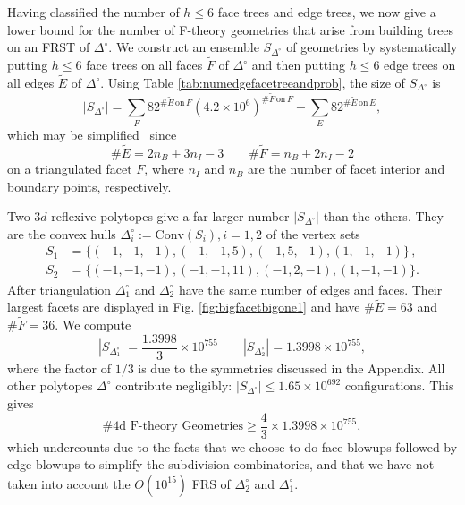 \documentclass[aps,prl,twocolumn, superscriptaddress,groupedaddress,nofootinbib]{revtex4-1}
\newcommand{\sdoc}{S_{\Delta_1^\circ}}
\newcommand{\sdtc}{S_{\Delta_2^\circ}}
\newcommand{\doc}{{\Delta_1^\circ}}
\newcommand{\dtc}{{\Delta_2^\circ}}
\begin{document}
\vspace{.5cm}
Having classified the number of $h\leq 6$ face trees and edge trees, we now give a lower bound for
the number of F-theory geometries that arise from building trees on an FRST of 
$\Delta^\circ$. 
We construct an ensemble $S_{\Delta^\circ}$ of geometries by systematically putting $h\leq 6$ face trees on all
faces $\tilde F$ of $\Delta^\circ$ and then putting $h\leq 6$ edge trees on
all edges $\tilde E$ of $\Delta^\circ$. Using Table \ref{tab:numedgefacetreeandprob}, the size of $S_{\Delta^\circ}$ is
\begin{equation}
|S_{\Delta^\circ}| = \sum_F 82^{\# \tilde E \, \text{on} \, F} (4.2\times 10^6)^{\# \tilde F \, \text{on} \, F} - \sum_E 82^{\# \tilde E \, \text{on} \, E}, \nonumber
\end{equation}
which may be simplified~\cite{DeLoera:2010:TSA:1952022} since
\begin{equation}
\#\tilde E = 2n_B + 3n_I - 3 \qquad \# \tilde F = n_B+2n_I-2
\end{equation}
on a triangulated facet $F$,
where $n_I$ and $n_B$ are the number of facet interior and boundary points,
respectively. 

Two $3d$ reflexive polytopes give a far larger number $|S_{\Delta^\circ}|$
than the others. They
are  the convex hulls $\Delta_i^\circ := \text{Conv}(S_i), i=1,2$ of the
vertex sets
\begin{align} 
S_1 &= \{ (-1,-1,-1),(-1,-1,5),(-1,5,-1),(1,-1,-1)\}\, , \nonumber \\
S_2 &= \{ (-1,-1,-1),(-1,-1,11),(-1,2,-1),(1,-1,-1)\}. \nonumber
\end{align}
After triangulation $\doc$ and $\dtc$ have the same number of edges and faces. 
Their largest facets are displayed in  Fig. \ref{fig:bigfacetbigone1} and have $\# \tilde E = 63$ and $\# \tilde F=36$. We compute
\begin{equation}
|\sdoc| = \frac{1.3998}{3} \times 10^{755} \qquad |\sdtc| = 1.3998 \times 10^{755},
\label{eqn:sdocsdtccounts}
\end{equation}
where the factor of $1/3$ is due to the symmetries discussed in the Appendix.
All other polytopes $\Delta^\circ$ contribute negligibly:
$|S_{\Delta^\circ}| \leq 1.65\times 10^{692}$
configurations. This gives
\begin{equation}
\text{\# 4d F-theory Geometries} \geq \frac43 \times 1.3998 \times 10^{755},
\end{equation}
which undercounts due to the facts that we choose to do face blowups followed by
edge blowups to simplify the subdivision combinatorics, and
that we have not taken into account the $O(10^{15})$ FRS of 
$\dtc$ and $\doc$. %
\end{document}
